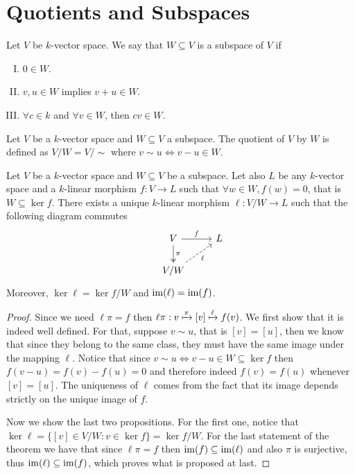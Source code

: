 \section{Quotients and Subspaces}

\begin{definition}[Subspace]\label{def: subspace}
   Let \(V\) be \(k\)-vector space. We say that \(W \subseteq  V\) is a subspace
   of \(V\) if
   \begin{enumerate}[I.]
     \item \(0 \in W\).
     \item \(v, u \in W\) implies \(v + u \in W\).
     \item \(\forall c \in k\) and \(\forall v \in W\), then \(cv \in W\).
   \end{enumerate}
\end{definition}

\begin{definition}[Quotient]\label{def: quotient}
   Let \(V\) be a \(k\)-vector space and \(W \subseteq V\) a subspace. The
   quotient of \(V\) by \(W\) is defined as \(V/W = V/{\sim}\) where \(v
   \sim u \Leftrightarrow v - u \in W\).
\end{definition}

\begin{theorem}
  \label{thm: universal property for quotients}
  Let \(V\) be a \(k\)-vector space and \(W \subseteq V\) be a subspace. Let
  also \(L\) be any \(k\)-vector space and a \(k\)-linear morphism \(f : V \to L
  \) such that \(\forall w \in W, f(w) = 0\), that is \(W \subseteq \ker f\).
  There exists a unique \(k\)-linear morphism \(\ell: V/W \to L\) such that the
  following diagram commutes
  \[
    \begin{tikzcd}
       &V \ar["f", r] \ar["\pi", twoheadrightarrow, d] &L \\
       &V/W \ar[swap, dashed, "\ell", ru]
    \end{tikzcd}
  \]
  Moreover, \(\ker \ell = \ker f / W\) and  \(\operatorname{im}(\ell) = \operatorname{im}(f)\).
\end{theorem}

\begin{proof}
  Since we need \(\ell  \pi = f\) then \(\ell  \pi : v \xmapsto \pi
  [v] \xmapsto \ell f(v)\). We first show that it is indeed well
  defined. For that, suppose \(v \sim u\), that is \([v] =
  [u]\), then we know that since they belong to the same class, they must have the
  same image under the mapping \(\ell\). Notice that since \(v \sim u
  \Leftrightarrow v - u \in W \subseteq \ker f\) then \(f(v - u) = f(v) - f(u) =
  0\) and therefore indeed \(f(v) = f(u)\) whenever \([v] =
  [u]\). The uniqueness of \(\ell\) comes from the fact that its image depends
  strictly on the unique image of \(f\).

  Now we show the last two propositions. For the first one, notice that \(\ker
  \ell = \{[v] \in V/W : v \in \ker f\} = \ker f / W\). For the last
  statement of the theorem we have that since \(\ell  \pi = f\) then
  \(\operatorname{im}(f) \subseteq \operatorname{im}(\ell)\) and also \(\pi\) is surjective, thus
  \(\operatorname{im}(\ell) \subseteq \operatorname{im}(f)\), which proves what is proposed at last.
\end{proof}

